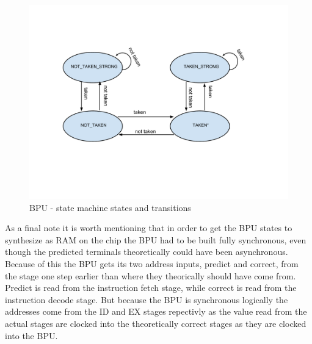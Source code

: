 \begin{figure}[ht]
        \centering\includegraphics[scale=0.5]{figures/BPU_state_machine}
        \caption{BPU - state machine states and transitions}
        \label{fig:bpu_state_machine}
\end{figure}

As a final note it is worth mentioning that in order to get the BPU states to
synthesize as RAM on the chip the BPU had to be built fully synchronous,
even though the predicted terminals theoretically could have been 
asynchronous. Because of this the BPU gets its two address inputs, predict
and correct, from the stage one step earlier than where they theorically
should have come from. Predict is read from the instruction fetch stage, while correct is read from the instruction decode stage. But
because the BPU is synchronous logically the addresses come from the
ID and EX stages repectivly as the value read from the actual stages are
clocked into the theoretically correct stages as they are clocked into the
BPU.